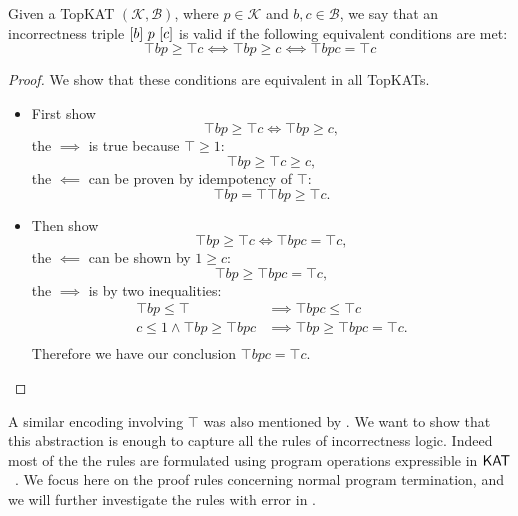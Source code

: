 \begin{theorem}
  Given a TopKAT \((𝒦, ℬ)\), where \(p ∈ 𝒦\) and
  \(b, c ∈ ℬ\), we say that an incorrectness triple
  \([b]~p~[c]\) is valid if the following equivalent conditions are
  met:
  \[⊤ b p ≥ ⊤ c ⟺ ⊤ b p ≥ c ⟺ ⊤ b p c = ⊤ c\]
\end{theorem}

\begin{proof}
We show that these conditions are equivalent in all TopKATs.
\begin{itemize}
    \item First show \[\top b p \geq \top c \iff \top b p \geq c,\]
    the \(\implies\) is true because \(\top \geq 1\):
    \[\top b p \geq \top c \geq c,\]
    the \(\impliedby\) can be proven by idempotency of \(\top\):
    \[\top b p = \top \top b p \geq \top c.\]
    \item Then show \[\top b p \geq \top c \iff \top b p c = \top c,\]
    the \(\impliedby\) can be shown by \(1 \geq c\):
    \[\top b p \geq \top b p c = \top c,\]
    the \(\implies\) is by two inequalities:
    \begin{align*}
        \top b p \leq \top & \implies \top b p c \leq \top c \\
        c \leq 1 \land \top b p \geq \top b p c & \implies \top b p \geq \top b p c = \top c.\\
    \end{align*}
    Therefore we have our conclusion \(\top b p c = \top c\). \qedhere
\end{itemize}
\end{proof}

A similar encoding involving \(\top\) was also mentioned by \citet{OHearn_2020}.
We want to show that this abstraction is enough to capture all the rules of
incorrectness logic.  Indeed most of the the rules are formulated using program
operations expressible in \(\mathsf{KAT}\) ~\cite{OHearn_2020}.  We
focus here on the proof rules concerning normal program termination, and we will
further investigate the rules with error in .


